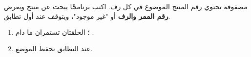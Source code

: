 \begin{statement}
مصفوفة  تحتوي رقم المنتج الموضوع في كل رف. اكتب برنامجًا يبحث عن منتج ويعرض \textbf{رقم الممر والرف} أو "غير موجود"، ويتوقف عند أول تطابق.
\end{statement}
\begin{stepsbox}\begin{enumerate}
\item {}؛ الحلقتان تستمران ما دام .
\item عند التطابق نحفظ الموضع.
\end{enumerate}\end{stepsbox}
